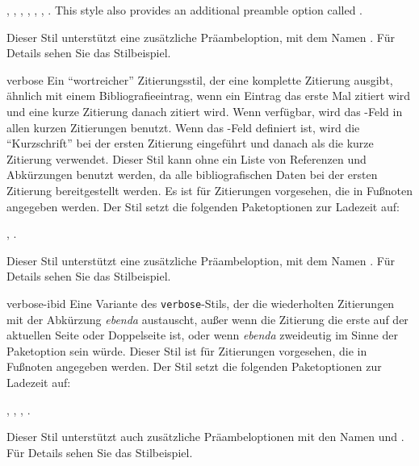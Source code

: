 \documentclass{ltxdockit}[2011/03/25]
\begin{document}
\begin{marglist}
, , , , , , . This style also provides an additional preamble option called .


Dieser Stil unterstützt eine zusätzliche
Präambeloption, mit dem Namen . Für Details sehen Sie das
Stilbeispiel.     

\item[verbose] Ein "`wortreicher"' Zitierungsstil, der eine komplette 
Zitierung ausgibt, ähnlich
mit einem Bibliografieeintrag, wenn ein Eintrag das erste Mal zitiert wird und
eine kurze Zitierung danach zitiert wird. Wenn verfügbar, wird das
-Feld in allen kurzen Zitierungen benutzt. Wenn das
-Feld definiert ist, wird die "`Kurzschrift"' bei der ersten
Zitierung eingeführt und danach als die kurze Zitierung verwendet. Dieser Stil
kann ohne ein Liste von Referenzen und Abkürzungen benutzt werden, da alle
bibliografischen Daten bei der ersten Zitierung bereitgestellt werden. Es ist
für Zitierungen vorgesehen, die in Fußnoten angegeben werden. Der Stil setzt die
folgenden Paketoptionen zur Ladezeit auf: 


, . 

Dieser Stil unterstützt eine zusätzliche
Präambeloption, mit dem Namen . Für Details sehen Sie das
Stilbeispiel.  

\item[verbose-ibid] Eine Variante des \texttt{verbose}-Stils, der die 
wiederholten Zitierungen mit
der Abkürzung \emph{ebenda} austauscht, außer wenn die Zitierung die erste auf
der aktuellen Seite oder Doppelseite ist, oder wenn \emph{ebenda} zweideutig im
Sinne der Paketoption  sein würde. Dieser Stil ist
für Zitierungen vorgesehen, die in Fußnoten angegeben werden. Der Stil setzt die
folgenden Paketoptionen zur Ladezeit auf: 

, , , .


Dieser Stil unterstützt auch zusätzliche
Präambeloptionen mit den Namen  und . Für Details
sehen Sie das Stilbeispiel.  


\end{marglist}
\end{document}
